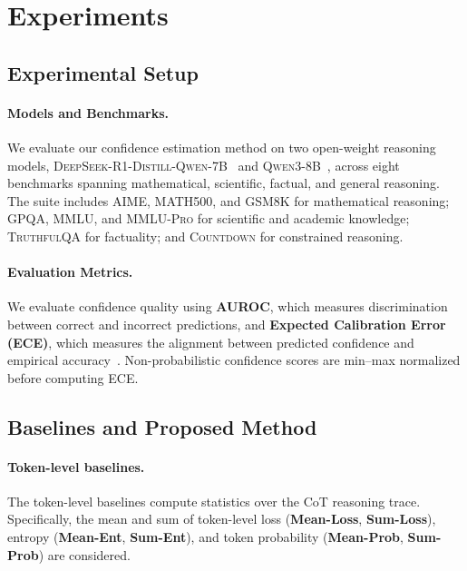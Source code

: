 \documentclass{article} %
\begin{document}
\section{Experiments}
\label{sec:experiments}

\subsection{Experimental Setup}
\label{sec:experimental_setup}

\paragraph{Models and Benchmarks.}
We evaluate our confidence estimation method on two open-weight reasoning models, \textsc{DeepSeek-R1-Distill-Qwen-7B}~\cite{guo2025deepseek} and \textsc{Qwen3-8B}~\cite{yang2025qwen3}, across eight benchmarks spanning mathematical, scientific, factual, and general reasoning. The suite includes \textsc{AIME}, \textsc{MATH500}, and \textsc{GSM8K} for mathematical reasoning; \textsc{GPQA}, \textsc{MMLU}, and \textsc{MMLU-Pro} for scientific and academic knowledge; \textsc{TruthfulQA} for factuality; and \textsc{Countdown} for constrained reasoning.


\paragraph{Evaluation Metrics.}
We evaluate confidence quality using \textbf{AUROC}, which measures discrimination between correct and incorrect predictions, and \textbf{Expected Calibration Error (ECE)}, which measures the alignment between predicted confidence and empirical accuracy~\cite{guo2017calibration,kadavath2022language}. Non-probabilistic confidence scores are min--max normalized before computing ECE.


\subsection{Baselines and Proposed Method}

\paragraph{Token-level baselines.}
The token-level baselines compute statistics over the CoT reasoning trace. Specifically, the mean and sum of token-level loss (\textbf{Mean-Loss}, \textbf{Sum-Loss}), entropy (\textbf{Mean-Ent}, \textbf{Sum-Ent}), and token probability (\textbf{Mean-Prob}, \textbf{Sum-Prob}) are considered.
\end{document}

